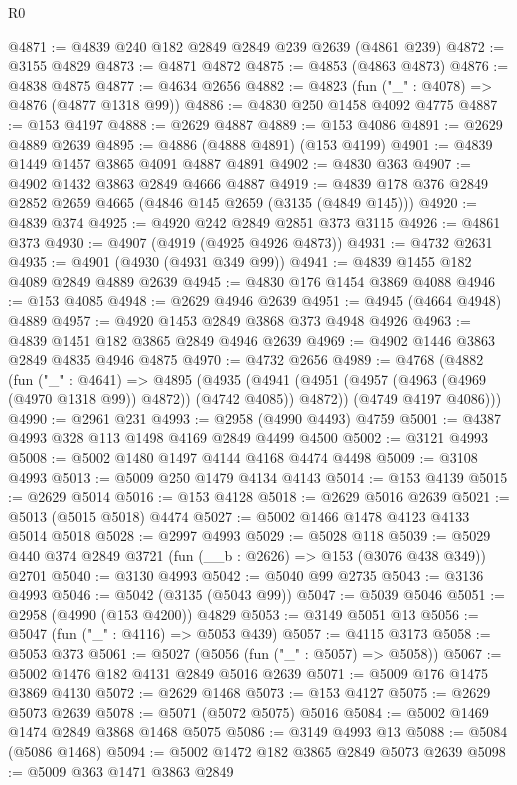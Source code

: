 \begin{lexlean}{R0}
\begin{coremodule}
@4871 := @4839 @240 @182 @2849 @2849 @239 @2639 (@4861 @239)
@4872 := @3155 @4829
@4873 := @4871 @4872
@4875 := @4853 (@4863 @4873)
@4876 := @4838 @4875
@4877 := @4634 @2656
@4882 := @4823 (fun ("_" : @4078) => @4876 (@4877 @1318 @99))
@4886 := @4830 @250 @1458 @4092 @4775
@4887 := @153 @4197
@4888 := @2629 @4887
@4889 := @153 @4086
@4891 := @2629 @4889 @2639
@4895 := @4886 (@4888 @4891) (@153 @4199)
@4901 := @4839 @1449 @1457 @3865 @4091 @4887 @4891
@4902 := @4830 @363
@4907 := @4902 @1432 @3863 @2849 @4666 @4887
@4919 := @4839 @178 @376 @2849 @2852 @2659 @4665 (@4846 @145 @2659 (@3135 (@4849 @145)))
@4920 := @4839 @374
@4925 := @4920 @242 @2849 @2851 @373 @3115
@4926 := @4861 @373
@4930 := @4907 (@4919 (@4925 @4926 @4873))
@4931 := @4732 @2631
@4935 := @4901 (@4930 (@4931 @349 @99))
@4941 := @4839 @1455 @182 @4089 @2849 @4889 @2639
@4945 := @4830 @176 @1454 @3869 @4088
@4946 := @153 @4085
@4948 := @2629 @4946 @2639
@4951 := @4945 (@4664 @4948) @4889
@4957 := @4920 @1453 @2849 @3868 @373 @4948 @4926
@4963 := @4839 @1451 @182 @3865 @2849 @4946 @2639
@4969 := @4902 @1446 @3863 @2849 @4835 @4946 @4875
@4970 := @4732 @2656
@4989 := @4768
    (@4882
      (fun ("_" : @4641) =>
      @4895
        (@4935 (@4941 (@4951 (@4957 (@4963 (@4969 (@4970 @1318 @99)) @4872)) (@4742 @4085)) @4872))
        (@4749 @4197 @4086)))
@4990 := @2961 @231
@4993 := @2958 (@4990 @4493) @4759
@5001 := @4387 @4993 @328 @113 @1498 @4169 @2849 @4499 @4500
@5002 := @3121 @4993
@5008 := @5002 @1480 @1497 @4144 @4168 @4474 @4498
@5009 := @3108 @4993
@5013 := @5009 @250 @1479 @4134 @4143
@5014 := @153 @4139
@5015 := @2629 @5014
@5016 := @153 @4128
@5018 := @2629 @5016 @2639
@5021 := @5013 (@5015 @5018) @4474
@5027 := @5002 @1466 @1478 @4123 @4133 @5014 @5018
@5028 := @2997 @4993
@5029 := @5028 @118
@5039 := @5029 @440 @374 @2849 @3721 (fun (__b : @2626) => @153 (@3076 @438 @349)) @2701
@5040 := @3130 @4993
@5042 := @5040 @99 @2735
@5043 := @3136 @4993
@5046 := @5042 (@3135 (@5043 @99))
@5047 := @5039 @5046
@5051 := @2958 (@4990 (@153 @4200)) @4829
@5053 := @3149 @5051 @13
@5056 := @5047 (fun ("_" : @4116) => @5053 @439)
@5057 := @4115 @3173
@5058 := @5053 @373
@5061 := @5027 (@5056 (fun ("_" : @5057) => @5058))
@5067 := @5002 @1476 @182 @4131 @2849 @5016 @2639
@5071 := @5009 @176 @1475 @3869 @4130
@5072 := @2629 @1468
@5073 := @153 @4127
@5075 := @2629 @5073 @2639
@5078 := @5071 (@5072 @5075) @5016
@5084 := @5002 @1469 @1474 @2849 @3868 @1468 @5075
@5086 := @3149 @4993 @13
@5088 := @5084 (@5086 @1468)
@5094 := @5002 @1472 @182 @3865 @2849 @5073 @2639
@5098 := @5009 @363 @1471 @3863 @2849

\end{coremodule}
\end{lexlean}
